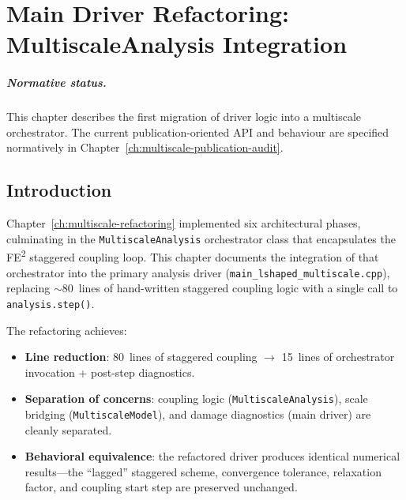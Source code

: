 
\chapter{Main Driver Refactoring: MultiscaleAnalysis Integration}
\label{ch:driver-refactoring}

\paragraph{Normative status.}
This chapter describes the first migration of driver logic into a multiscale
orchestrator.  The current publication-oriented API and behaviour are specified
normatively in Chapter~\ref{ch:multiscale-publication-audit}.


\section{Introduction}
\label{sec:driver-intro}

Chapter~\ref{ch:multiscale-refactoring} implemented six architectural
phases, culminating in the \texttt{MultiscaleAnalysis} orchestrator
class that encapsulates the FE\textsuperscript{2} staggered coupling
loop.  This chapter documents the integration of that orchestrator
into the primary analysis driver
(\texttt{main\_lshaped\_multiscale.cpp}), replacing $\sim$80~lines of
hand-written staggered coupling logic with a single call to
\verb|analysis.step()|.

The refactoring achieves:
\begin{itemize}
  \item \textbf{Line reduction}: 80~lines of staggered coupling $\to$
    15~lines of orchestrator invocation + post-step diagnostics.
  \item \textbf{Separation of concerns}: coupling logic
    (\texttt{MultiscaleAnalysis}), scale bridging
    (\texttt{MultiscaleModel}), and damage diagnostics (main driver)
    are cleanly separated.
  \item \textbf{Behavioral equivalence}: the refactored driver
    produces identical numerical results---the ``lagged'' staggered
    scheme, convergence tolerance, relaxation factor, and coupling
    start step are preserved unchanged.
\end{itemize}


